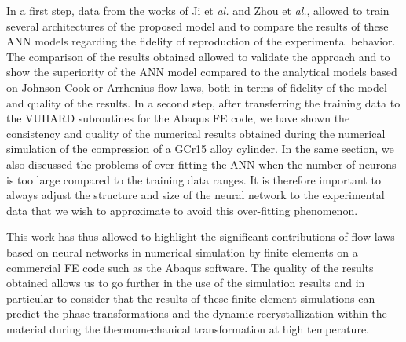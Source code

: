 \documentclass[algorithms,article,submit,pdftex,moreauthors]{Definitions/mdpi}
\makeatletter
\DeclareRobustCommand{\eal}{et \emph{al.}\@\xspace}
\makeatother
\begin{document}
In a first step, data from the works of Ji \eal \cite{Ji-2018} and Zhou \eal \cite{Zhou-2020}, allowed to train several architectures of the proposed model and to compare the results of these ANN models regarding the fidelity of reproduction of the experimental behavior.
The comparison of the results obtained allowed to validate the approach and to show the superiority of the ANN model compared to the analytical models based on Johnson-Cook or Arrhenius flow laws, both in terms of fidelity of the model and quality of the results.
In a second step, after transferring the training data to the VUHARD subroutines for the Abaqus FE code, we have shown the consistency and quality of the numerical results obtained during the numerical simulation of the compression of a GCr15 alloy cylinder.
In the same section, we also discussed the problems of over-fitting the ANN when the number of neurons is too large compared to the training data ranges.
It is therefore important to always adjust the structure and size of the neural network to the experimental data that we wish to approximate to avoid this over-fitting phenomenon.

This work has thus allowed to highlight the significant contributions of flow laws based on neural networks in numerical simulation by finite elements on a commercial FE code such as the Abaqus software.
The quality of the results obtained allows us to go further in the use of the simulation results and in particular to consider that the results of these finite element simulations can predict the phase transformations and the dynamic recrystallization within the material during the thermomechanical transformation at high temperature.

\vspace{6pt}

\end{document}
